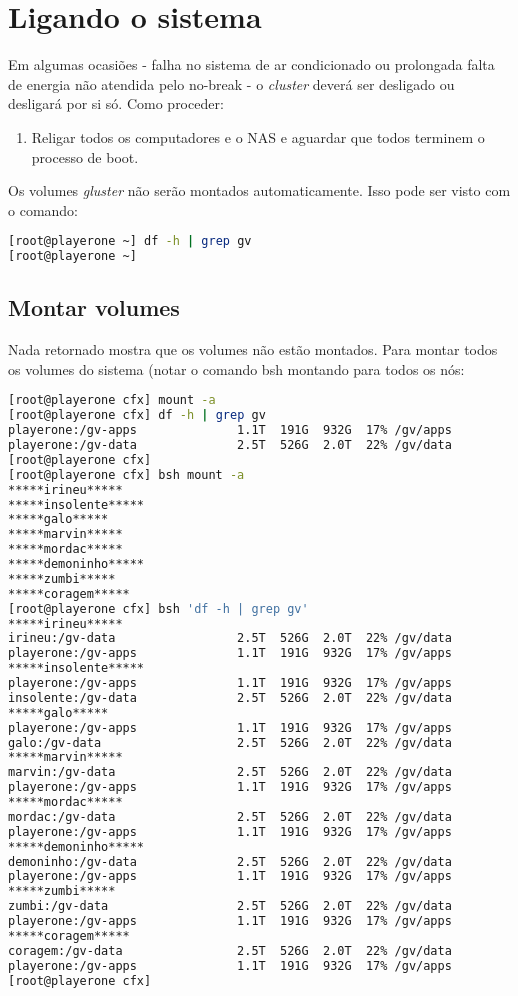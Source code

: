 \chapter{Ligando o sistema}
\label{chap:turn-on}

Em algumas ocasiões - falha no sistema de ar condicionado ou prolongada falta de energia não atendida pelo no-break - o \textit{cluster} deverá ser desligado ou desligará por si só. Como proceder:

\begin{enumerate}
    \item Religar todos os computadores e o NAS e aguardar que todos terminem o processo de boot. 
\end{enumerate}

Os volumes \textit{gluster} não serão montados automaticamente. Isso pode ser visto com o comando:

\begin{lstlisting}[language=bash,basicstyle=\small]
[root@playerone ~] df -h | grep gv
[root@playerone ~] 
\end{lstlisting}

\section{Montar volumes}
Nada retornado mostra que os volumes não estão montados. Para montar todos os volumes do sistema (notar o comando bsh montando para todos os nós:

\begin{lstlisting}[language=bash,basicstyle=\small]
[root@playerone cfx] mount -a  
[root@playerone cfx] df -h | grep gv
playerone:/gv-apps              1.1T  191G  932G  17% /gv/apps
playerone:/gv-data              2.5T  526G  2.0T  22% /gv/data
[root@playerone cfx] 
[root@playerone cfx] bsh mount -a
*****irineu*****
*****insolente*****
*****galo*****
*****marvin*****
*****mordac*****
*****demoninho*****
*****zumbi*****
*****coragem*****
[root@playerone cfx] bsh 'df -h | grep gv'
*****irineu*****
irineu:/gv-data                 2.5T  526G  2.0T  22% /gv/data
playerone:/gv-apps              1.1T  191G  932G  17% /gv/apps
*****insolente*****
playerone:/gv-apps              1.1T  191G  932G  17% /gv/apps
insolente:/gv-data              2.5T  526G  2.0T  22% /gv/data
*****galo*****
playerone:/gv-apps              1.1T  191G  932G  17% /gv/apps
galo:/gv-data                   2.5T  526G  2.0T  22% /gv/data
*****marvin*****
marvin:/gv-data                 2.5T  526G  2.0T  22% /gv/data
playerone:/gv-apps              1.1T  191G  932G  17% /gv/apps
*****mordac*****
mordac:/gv-data                 2.5T  526G  2.0T  22% /gv/data
playerone:/gv-apps              1.1T  191G  932G  17% /gv/apps
*****demoninho*****
demoninho:/gv-data              2.5T  526G  2.0T  22% /gv/data
playerone:/gv-apps              1.1T  191G  932G  17% /gv/apps
*****zumbi*****
zumbi:/gv-data                  2.5T  526G  2.0T  22% /gv/data
playerone:/gv-apps              1.1T  191G  932G  17% /gv/apps
*****coragem*****
coragem:/gv-data                2.5T  526G  2.0T  22% /gv/data
playerone:/gv-apps              1.1T  191G  932G  17% /gv/apps
[root@playerone cfx]
\end{lstlisting}


